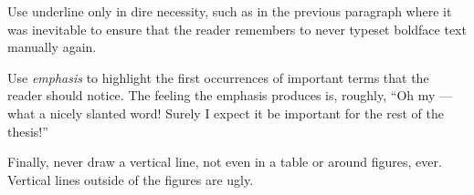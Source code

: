Use underline only in dire necessity, such as in the previous paragraph where it was inevitable to ensure that the reader remembers to never typeset boldface text manually again.

Use \emph{emphasis} to highlight the first occurrences of important terms that the reader should notice. The feeling the emphasis produces is, roughly, ``Oh my --- what a nicely slanted word! Surely I expect it be important for the rest of the thesis!''

Finally, never draw a vertical line, not even in a table or around figures, ever. Vertical lines outside of the figures are ugly.

